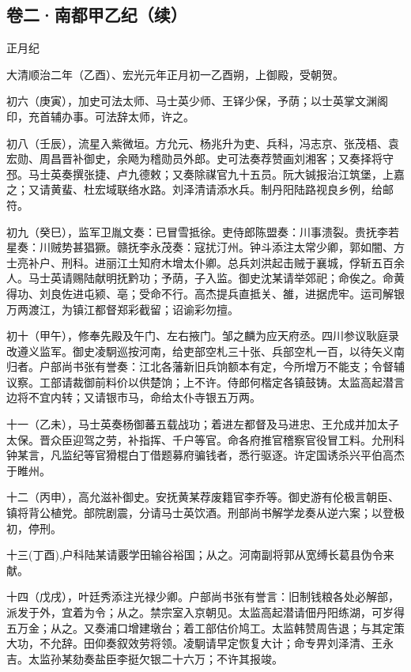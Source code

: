 \documentclass[]{article}
\begin{document}
\hypertarget{header-n22}{%
\subsection{卷二·南都甲乙纪（续）}\label{header-n22}}

正月纪

大清顺治二年（乙酉）、宏光元年正月初一乙酉朔，上御殿，受朝贺。

初六（庚寅），加史可法太师、马士英少师、王铎少保，予荫；以士英掌文渊阁印，充首辅办事。可法辞太师，许之。

初八（壬辰），流星入紫微垣。方允元、杨兆升为吏、兵科，冯志京、张茂梧、袁宏勋、周昌晋补御史，余飏为稽勋员外郎。史可法奏荐赞画刘湘客；又奏择将守邳。马士英奏撰张捷、卢九德敕；又奏除禖官九十五员。阮大铖报治江筑堡，上嘉之；又请黄蜚、杜宏域联络水路。刘泽清请添水兵。制丹阳陆路视良乡例，给邮符。

初九（癸巳），监军卫胤文奏：已冒雪抵徐。吏侍郎陈盟奏：川事溃裂。贵抚李若星奏：川贼势甚猖獗。赣抚李永茂奏：寇扰汀州。钟斗添注太常少卿，郭如闇、方士亮补户、刑科。进丽江土知府木增太仆卿。总兵刘洪起击贼于襄城，俘斩五百余人。马士英请赐陆献明抚黔功；予荫，子入监。御史沈某请举郊祀；命俟之。命黄得功、刘良佐进屯颍、亳；受命不行。高杰提兵直抵关、雒，进据虎牢。运司解银万两渡江，为镇江都督郑彩截留；诏谕彩勿擅。

初十（甲午），修奉先殿及午门、左右掖门。邹之麟为应天府丞。四川参议耿庭录改遵义监军。御史凌駉巡按河南，给吏部空札三十张、兵部空札一百，以待矢义南归者。户部尚书张有誉奏：江北各藩新旧兵饷额本有定，今所增万不能支；令督辅议察。工部请裁御前料价以供楚饷；上不许。侍郎何楷定各镇鼓铸。太监高起潜言边将不宜内转；又请银市马，命给太仆寺银五万两。

十一（乙未），马士英奏杨御蕃五载战功；着进左都督及马进忠、王允成并加太子太保。晋众臣迎驾之劳，补指挥、千户等官。命各府推官稽察官役冒工料。允刑科钟某言，凡监纪等官猾棍白丁借题募府骗钱者，悉行驱逐。许定国诱杀兴平伯高杰于睢州。

十二（丙申），高允滋补御史。安抚黄某荐废籍官李乔等。御史游有伦极言朝臣、镇将背公植党。部院剧震，分请马士英饮酒。刑部尚书解学龙奏从逆六案；以登极初，停刑。

十三(丁酉),户科陆某请覈学田输谷裕国；从之。河南副将郭从宽缚长葛县伪令来献。

十四（戊戌），叶廷秀添注光禄少卿。户部尚书张有誉言：旧制钱粮各处必解部，派发于外，宜着为令；从之。禁宗室入京朝见。太监高起潜请佃丹阳练湖，可岁得五万金；从之。又奏浦口增建墩台；着工部估价鸠工。太监韩赞周告退；与其定策大功，不允辞。田仰奏叙效劳将领。凌駉请早定恢复大计；命专畀刘泽清、王永吉。太监孙某劾奏盐臣李挺欠银二十六万；不许其报竣。
\end{document}
